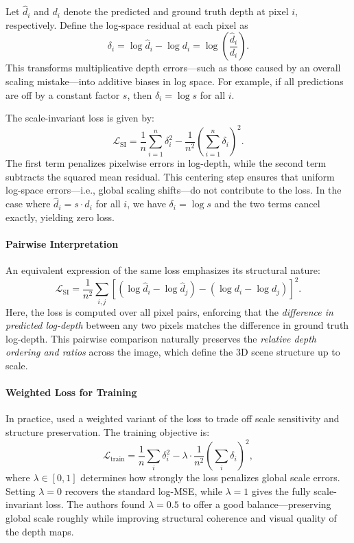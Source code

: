 Let \( \hat{d}_i \) and \( d_i \) denote the predicted and ground truth depth at pixel \( i \), respectively. Define the log-space residual at each pixel as
\[
\delta_i = \log \hat{d}_i - \log d_i = \log \left( \frac{\hat{d}_i}{d_i} \right).
\]
This transforms multiplicative depth errors—such as those caused by an overall scaling mistake—into additive biases in log space. For example, if all predictions are off by a constant factor \( s \), then \( \delta_i = \log s \) for all \( i \).

The scale-invariant loss is given by:
\[
\mathcal{L}_{\text{SI}} = \frac{1}{n} \sum_{i=1}^n \delta_i^2 - \frac{1}{n^2} \left( \sum_{i=1}^n \delta_i \right)^2.
\]
The first term penalizes pixelwise errors in log-depth, while the second term subtracts the squared mean residual. This centering step ensures that uniform log-space errors—i.e., global scaling shifts—do not contribute to the loss. In the case where \( \hat{d}_i = s \cdot d_i \) for all \( i \), we have \( \delta_i = \log s \) and the two terms cancel exactly, yielding zero loss.

\paragraph{Pairwise Interpretation}

An equivalent expression of the same loss emphasizes its structural nature:
\[
\mathcal{L}_{\text{SI}} = \frac{1}{n^2} \sum_{i,j} \left[ \left( \log \hat{d}_i - \log \hat{d}_j \right) - \left( \log d_i - \log d_j \right) \right]^2.
\]
Here, the loss is computed over all pixel pairs, enforcing that the \emph{difference in predicted log-depth} between any two pixels matches the difference in ground truth log-depth. This pairwise comparison naturally preserves the \emph{relative depth ordering and ratios} across the image, which define the 3D scene structure up to scale.

\paragraph{Weighted Loss for Training}

In practice, \cite{eigen2014_depth} used a weighted variant of the loss to trade off scale sensitivity and structure preservation. The training objective is:
\[
\mathcal{L}_{\text{train}} = \frac{1}{n} \sum_i \delta_i^2 - \lambda \cdot \frac{1}{n^2} \left( \sum_i \delta_i \right)^2,
\]
where \( \lambda \in [0,1] \) determines how strongly the loss penalizes global scale errors. Setting \( \lambda = 0 \) recovers the standard log-MSE, while \( \lambda = 1 \) gives the fully scale-invariant loss. The authors found \( \lambda = 0.5 \) to offer a good balance—preserving global scale roughly while improving structural coherence and visual quality of the depth maps.

